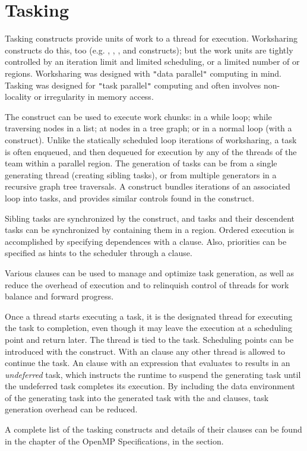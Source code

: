 \pagebreak
\chapter{Tasking}
\label{chap:tasking}

Tasking constructs provide units of work to a thread for execution.  
Worksharing constructs do this, too (e.g. , , 
, and  constructs); 
but the work units are tightly controlled by an iteration limit and limited 
scheduling, or a limited number of  or  regions. 
Worksharing was designed 
with \texttt{"}data parallel\texttt{"} computing in mind.  Tasking was designed for 
\texttt{"}task parallel\texttt{"} computing and often involves non-locality or irregularity 
in memory access.

The  construct can be used to execute work chunks: in a while loop; 
while traversing nodes in a list; at nodes in a tree graph; 
or in a normal loop (with a  construct).  
Unlike the statically scheduled loop iterations of worksharing, a task is 
often enqueued, and then dequeued for execution by any of the threads of the
team within a parallel region. The generation of tasks can be from a single 
generating thread (creating sibling tasks), or from multiple generators
in a recursive graph tree traversals. 
A  construct
bundles iterations of an associated loop into tasks, and provides 
similar controls found in the  construct.

Sibling tasks are synchronized by the  construct, and tasks
and their descendent tasks can be synchronized by containing them in
a  region.  Ordered execution is accomplished by specifying
dependences with a  clause. Also, priorities can be
specified as hints to the scheduler through a  clause.

Various clauses can be used to manage and optimize task generation,
as well as reduce the overhead of execution and to relinquish 
control of threads for work balance and forward progress. 

Once a thread starts executing a task, it is the designated thread 
for executing the task to completion, even though it may leave the
execution at a scheduling point and return later.  The thread is tied
to the task.  Scheduling points can be introduced with the 
construct.  With an  clause any other thread is allowed to continue
the task.  An  clause with an expression that evaluates to  
results in an \emph{undeferred} task, which instructs the runtime to suspend
the generating task until the undeferred task completes its execution.
By including the data environment of the generating task into the generated task with the 
 and  clauses, task generation overhead can be reduced.

A complete list of the tasking constructs and details of their clauses
can be found in the  chapter of the OpenMP Specifications,
in the  section.

